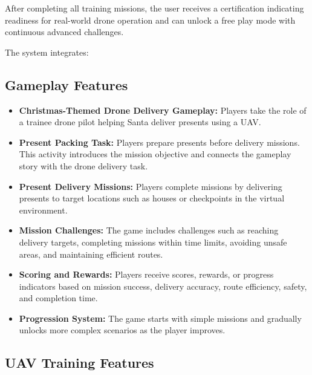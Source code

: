 After completing all training missions, the user receives a certification indicating readiness for real-world drone operation and can unlock a free play mode with continuous advanced challenges.

The system integrates:

\subsection{Gameplay Features}
\label{subsection:Gameplay Features}

\begin{itemize}
    \item \textbf{Christmas-Themed Drone Delivery Gameplay:} Players take the role of a trainee drone pilot helping Santa deliver presents using a UAV.
    \item \textbf{Present Packing Task:} Players prepare presents before delivery missions. This activity introduces the mission objective and connects the gameplay story with the drone delivery task.
    \item \textbf{Present Delivery Missions:} Players complete missions by delivering presents to target locations such as houses or checkpoints in the virtual environment.
    \item \textbf{Mission Challenges:} The game includes challenges such as reaching delivery targets, completing missions within time limits, avoiding unsafe areas, and maintaining efficient routes.
    \item \textbf{Scoring and Rewards:} Players receive scores, rewards, or progress indicators based on mission success, delivery accuracy, route efficiency, safety, and completion time.
    \item \textbf{Progression System:} The game starts with simple missions and gradually unlocks more complex scenarios as the player improves.
\end{itemize}


\subsection{UAV Training Features}
\label{subsection:UAV Training Features}

